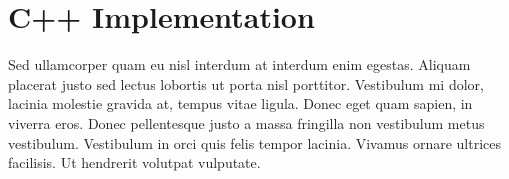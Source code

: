 
\section{C++ Implementation}

Sed ullamcorper quam eu nisl interdum at interdum enim egestas. Aliquam placerat justo sed lectus lobortis ut porta nisl porttitor. Vestibulum mi dolor, lacinia molestie gravida at, tempus vitae ligula. Donec eget quam sapien, in viverra eros. Donec pellentesque justo a massa fringilla non vestibulum metus vestibulum. Vestibulum in orci quis felis tempor lacinia. Vivamus ornare ultrices facilisis. Ut hendrerit volutpat vulputate. 


